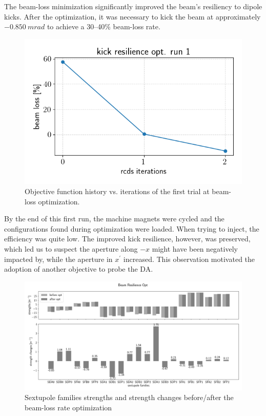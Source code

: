 \documentclass[a4paper,11pt]{article}
\begin{document}
The beam-loss minimization significantly improved the beam's resiliency to dipole kicks. After the optimization, it was necessary to kick the beam at approximately $-0.850~\unit{m rad}$ to achieve a  30--40\% beam-loss rate.
\begin{figure}
    \centering
    \includegraphics[scale=0.7]{beam_loss_hist_run1.png}
    \caption{Objective function history vs. iterations of the first trial at beam-loss optimization.}
    \label{beam_loss_hist}
\end{figure}

By the end of this first run, the machine magnets were cycled and the configurations found during optimization were loaded. When trying to inject, the efficiency was quite low. The improved kick resilience, however, was preserved, which led us to suspect the aperture along $-x$ might have been negatively impacted by, while the aperture in $x^\prime$ increased. This observation motivated the adoption of another objective to probe the DA.

\begin{figure}[t]
    \centering
    \includegraphics*[width=\textwidth]{beam_loss_sexts.png}
    \caption{Sextupole families strengths and strength changes before/after the beam-loss rate optimization}
    \label{beam_loss_sexts}
\end{figure}
\end{document}
